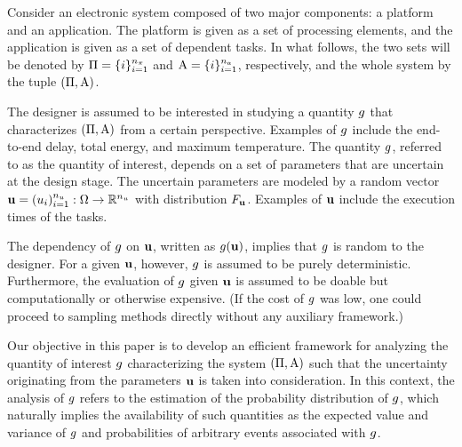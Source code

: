 Consider an electronic system composed of two major components: a platform and
an application. The platform is given as a set of processing elements, and the
application is given as a set of dependent tasks. In what follows, the two sets
will be denoted by $\Pi = \{ i \}_{i = 1}^{n_\pi}$ and $\mathrm{A} = \{ i \}_{i =
1}^{n_a}$, respectively, and the whole system by the tuple $(\Pi, \mathrm{A})$.

The designer is assumed to be interested in studying a quantity $g$ that
characterizes $(\Pi, \mathrm{A})$ from a certain perspective. Examples of $g$
include the end-to-end delay, total energy, and maximum temperature. The
quantity $g$, referred to as the quantity of interest, depends on a set of
parameters that are uncertain at the design stage. The uncertain parameters are
modeled by a random vector $\mathbf{u} = (u_i)_{i = 1}^{n_u}: \Omega \to \mathbb{R}^{n_u}$
with distribution $F_{\mathbf{u}}$. Examples of $\mathbf{u}$ include the execution
times of the tasks.

The dependency of $g$ on $\mathbf{u}$, written as $g(\mathbf{u})$, implies that $g$ is
random to the designer. For a given $\mathbf{u}$, however, $g$ is assumed to be purely
deterministic. Furthermore, the evaluation of $g$ given $\mathbf{u}$ is assumed to be
doable but computationally or otherwise expensive. (If the cost of $g$ was low,
one could proceed to sampling methods directly without any auxiliary framework.)

Our objective in this paper is to develop an efficient framework for analyzing
the quantity of interest $g$ characterizing the system $(\Pi, \mathrm{A})$ such
that the uncertainty originating from the parameters $\mathbf{u}$ is taken into
consideration. In this context, the analysis of $g$ refers to the estimation of
the probability distribution of $g$, which naturally implies the availability
of such quantities as the expected value and variance of $g$ and probabilities
of arbitrary events associated with $g$.
